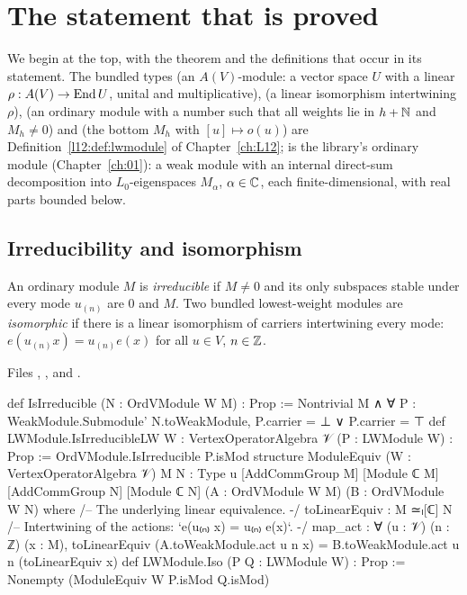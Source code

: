 \section{The statement that is proved}\label{l13:sec:statement}

We begin at the top, with the theorem and the definitions that occur in its statement. The bundled types
 (an $A(V)$-module: a vector space $U$ with a linear $\rho:A(V)\to\operatorname{End} U$, unital and multiplicative),
 (a linear isomorphism intertwining $\rho$),  (an ordinary module
 with a number  such that all weights lie in $h+{\mathbb{N}}$ and $M_h\neq0$) and
 (the bottom $M_h$ with $[u]\mapsto o(u)$) are Definition~\ref{l12:def:lwmodule} of
Chapter~\ref{ch:L12};  is the library's ordinary module (Chapter~\ref{ch:01}): a weak module with an
internal direct-sum decomposition into $L_0$-eigenspaces $M_\alpha$, $\alpha\in{\mathbb{C}}$, each finite-dimensional, with real
parts bounded below.

\subsection{Irreducibility and isomorphism}

\begin{definition}\label{l13:def:irr}
An ordinary module $M$ is \emph{irreducible} if $M\neq0$ and its only subspaces stable under every mode $u_{(n)}$ are $0$
and $M$. Two bundled lowest-weight modules are \emph{isomorphic} if there is a linear isomorphism of carriers
intertwining every mode: $e(u_{(n)}x) = u_{(n)}e(x)$ for all $u\in V$, $n\in{\mathbb{Z}}$.
\end{definition}
\noindent Files ,
,
 and
.
\begin{leancode}
def IsIrreducible (N : OrdVModule W M) : Prop :=
  Nontrivial M ∧ ∀ P : WeakModule.Submodule' N.toWeakModule, P.carrier = ⊥ ∨ P.carrier = ⊤
def LWModule.IsIrreducibleLW {W : VertexOperatorAlgebra 𝒱} (P : LWModule W) : Prop :=
  OrdVModule.IsIrreducible P.isMod
structure ModuleEquiv (W : VertexOperatorAlgebra 𝒱) {M N : Type u} [AddCommGroup M]
    [Module ℂ M] [AddCommGroup N] [Module ℂ N] (A : OrdVModule W M) (B : OrdVModule W N) where
  /-- The underlying linear equivalence. -/
  toLinearEquiv : M ≃ₗ[ℂ] N
  /-- Intertwining of the actions: `e(u₍ₙ₎ x) = u₍ₙ₎ e(x)`. -/
  map_act : ∀ (u : 𝒱) (n : ℤ) (x : M),
    toLinearEquiv (A.toWeakModule.act u n x) = B.toWeakModule.act u n (toLinearEquiv x)
def LWModule.Iso (P Q : LWModule W) : Prop :=
  Nonempty (ModuleEquiv W P.isMod Q.isMod)
\end{leancode}

